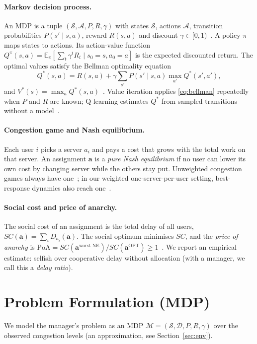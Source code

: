 \documentclass{article}
\begin{document}
\paragraph{Markov decision process.} An MDP is a tuple $(\mathcal S,\mathcal A,P,R,\gamma)$
with states $\mathcal S$, actions $\mathcal A$, transition probabilities
$P(s'\mid s,a)$, reward $R(s,a)$ and discount $\gamma\in[0,1)$~\cite{puterman1994}.
A policy $\pi$ maps states to actions. Its action-value function
$Q^\pi(s,a)=\mathbb E_\pi\!\left[\sum_{t}\gamma^tR_t\mid s_0=s,a_0=a\right]$ is the expected
discounted return. The optimal values satisfy the Bellman optimality equation
\begin{equation}
Q^*(s,a)=R(s,a)+\gamma\sum_{s'}P(s'\mid s,a)\max_{a'}Q^*(s',a'),
\label{eq:bellman}
\end{equation}
and $V^*(s)=\max_aQ^*(s,a)$~\cite{bellman1957}. Value iteration applies
\eqref{eq:bellman} repeatedly when $P$ and $R$ are known; Q-learning estimates $Q^*$
from sampled transitions without a model~\cite{watkins1992,sutton2018}.

\paragraph{Congestion game and Nash equilibrium.} Each user $i$ picks a server $a_i$ and
pays a cost that grows with the total work on that server. An assignment
$\bm a$ is a \emph{pure Nash equilibrium} if no user can lower its own cost by changing
server while the others stay put. Unweighted congestion games always have one~\cite{rosenthal1973};
in our weighted one-server-per-user setting, best-response dynamics also reach
one~\cite{evendar2003convergence}.

\paragraph{Social cost and price of anarchy.} The social cost of an assignment is the
total delay of all users, $SC(\bm a)=\sum_iD_{a_i}(\bm a)$. The social optimum minimises
$SC$, and the \emph{price of anarchy} is
$\mathrm{PoA}=SC(\bm a^{\text{worst NE}})/SC(\bm a^{\text{OPT}})\ge1$~\cite{koutsoupias1999,roughgarden2002}.
We report an empirical estimate: selfish over cooperative delay without allocation (with a
manager, we call this a \emph{delay ratio}).

\section{Problem Formulation (MDP)}\label{sec:mdp}
We model the manager's problem as an MDP $\mathcal{M}=(\mathcal{S},\mathcal{D},P,R,\gamma)$ over
the observed congestion levels (an approximation, see Section~\ref{sec:env}).
\end{document}
